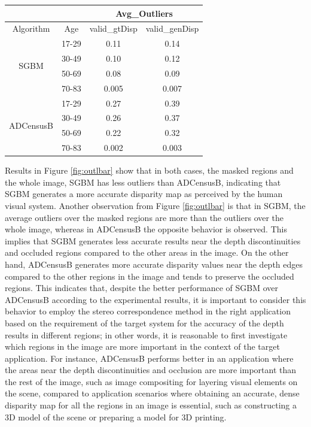 \begin{minipage}{\linewidth}
\begin{center}
\label{tab:outlfull}
\begin{tabular}{ |c|c|c|c| }
\hline
\multicolumn{2}{|c}{} & \multicolumn{2}{|c|}{Avg\_Outliers} \\
\hline
Algorithm & Age & valid\_gtDisp & valid\_genDisp \\ \hline
\multirow{4}{*}{SGBM} & 17-29 & 0.11 & 0.14 \\
& 30-49 & 0.10 & 0.12 \\
& 50-69 & 0.08 & 0.09 \\
& 70-83 & 0.005 & 0.007 \\ \hline
\multirow{4}{*}{ADCensusB} & 17-29 & 0.27 & 0.39 \\
& 30-49 & 0.26 & 0.37 \\
& 50-69 & 0.22 & 0.32 \\
& 70-83 & 0.002 & 0.003 \\ \hline
\end{tabular}
\end{center}
\end{minipage} \newline \newline

Results in Figure \ref{fig:outlbar} show that in both cases, the masked regions and the whole image, SGBM has less outliers than ADCensusB, indicating that
SGBM generates a more accurate disparity map as perceived by the human visual system.
Another observation from Figure \ref{fig:outlbar} is that in SGBM, the average outliers over the masked regions are more than the outliers over the whole image, whereas in ADCensusB the
opposite behavior is observed. This implies that SGBM generates less accurate results
near the depth discontinuities and occluded regions compared to the other areas in the image.
On the other hand, ADCensusB generates more accurate disparity values near the depth edges compared to the other regions in the image and 
tends to preserve the occluded regions. This indicates that, despite the better performance of SGBM over ADCensusB according to the
experimental results, it is important to consider this behavior to employ the stereo correspondence method
in the right application based on the requirement of the target system for the accuracy of the depth results in different regions; in other
words, it is reasonable to first investigate which regions in the image are more important in the context of the target application.
For instance, ADCensusB performs better in an application where the areas
near the depth discontinuities and occlusion are more important than the rest of the image, such as image compositing for layering visual elements
on the scene, compared to application scenarios where obtaining an accurate, dense disparity map for all the regions in an image is essential, such as
constructing a 3D model of the scene or preparing a model for 3D printing.


